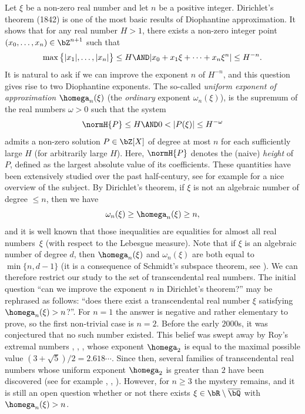 Let $\xi$ be a non-zero real number and let $n$ be a positive integer. Dirichlet's theorem (1842) is one of the most basic results of Diophantine approximation. It shows that for any real number $H > 1$, there exists a non-zero integer point $(x_0,\dots,x_n)\in\bZ^{n+1}$ such that
\begin{equation}
\label{eq: Dirichlet system}
\max\big\{|x_1|,\dots,|x_n|\big\} \leq H \AND |x_0 + x_1\xi + \cdots + x_n\xi^n| \leq H^{-n}.
\end{equation}
It is natural to ask if we can improve the exponent $n$ of $H^{-n}$, and this question gives rise to two Diophantine exponents. The so-called \emph{uniform exponent of approximation} $\homega_n(\xi)$ (\resp the \emph{ordinary} exponent $\omega_n(\xi)$), is the supremum of the real numbers $\omega > 0$ such that the system
\begin{equation*}
\normH{P} \leq H \AND 0 <|P(\xi)| \leq H^{-\omega}
\end{equation*}
admits a non-zero solution $P\in\bZ[X]$ of degree at most $n$ for each sufficiently large $H$ (\resp for arbitrarily large $H$). Here, $\normH{P}$ denotes the (naive) \emph{height} of $P$, defined as the largest absolute value of its coefficients. These quantities have been extensively studied over the past half-century, see for example \cite{bugeaud2015exponents} for a nice overview of the subject. By Dirichlet's theorem, if $\xi$ is not an algebraic number of degree $\leq n$, then we have
\[
\omega_n(\xi) \geq \homega_n(\xi) \geq n,
\]
and it is well known that those inequalities are equalities for almost all real numbers~$\xi$ (with respect to the Lebesgue measure). Note that if $\xi$ is an algebraic number of degree $d$, then $\homega_n(\xi)$ and $\omega_n(\xi)$ are both equal to $\min\{n,d-1\}$ (it is a consequence of Schmidt's subspace theorem, see \cite[Th.\,2.10]{bugeaud2015exponents}). We can therefore restrict our study to the set of transcendental real numbers. The initial question ``can we improve the exponent $n$ in Dirichlet's theorem?'' may be rephrased as follows: ``does there exist a transcendental real number $\xi$ satisfying $\homega_n(\xi) > n$?''. For $n=1$ the answer is negative and rather elementary to prove, so the first non-trivial case is $n=2$. Before the early $2000$s, it was conjectured that no such number existed. This belief was swept away by Roy's extremal numbers \cite{roy2003approximation}, \cite{roy2004approximation}, \cite{arbourRoyCriterionDegreTwo}, whose exponent $\homega_2$ is equal to the maximal possible value $(3+\sqrt 5)/2 = 2.618\cdots$. Since then, several families of transcendental real numbers whose uniform exponent $\homega_2$ is greater than $2$ have been discovered (see for example \cite{roy2007two}, \cite{bugeaud2005exponentsSturmian}, \cite{poels2017exponents, poelsExpoGeneralClass2021}). However, for $n \geq 3$ the mystery remains, and it is still an open question whether or not there exists $\xi\in\bR\setminus\overline{\bQ}$ with $\homega_n(\xi) > n$.

